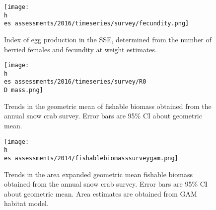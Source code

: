 \documentclass[11pt]{article}
\newcommand{\D}{.}
\newcommand{\h}{/home/hubleyb/}
\newcommand{\es}{bio.data/bio.snowcrab/}
\begin{document}
\clearpage
\begin{figure} %
\centering
\texttt{[image: \\h \\es assessments/2016/timeseries/survey/fecundity.png]}\\ 
\caption{Index of egg production in the SSE, determined from the number of berried females and fecundity at weight estimates.}
\end{figure}
\clearpage

\begin{figure}
\centering
\texttt{[image: \\h \\es assessments/2016/timeseries/survey/R0\\D mass.png]}\\ 
\caption{Trends in the geometric mean of fishable biomass obtained from the annual snow crab survey. Error bars are 95\% CI about geometric mean.}
\end{figure} %
\clearpage




\begin{figure}
\centering
\texttt{[image: \\h \\es assessments/2014/fishablebiomasssurveygam.png]}\\ 
\caption{Trends in the area expanded geometric mean fishable biomass obtained from the annual snow crab survey. Error bars are 95\% CI about geometric mean. Area estimates are obtained from GAM habitat model.}
\end{figure} %
\clearpage



\end{document}
